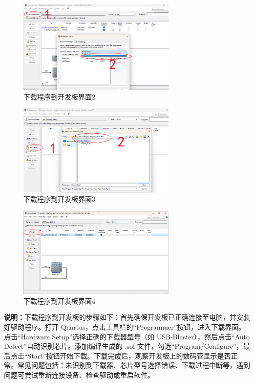 \documentclass[UTF8]{article}
\theoremstyle{MyLineTheoremStyle} %
\theoremstyle{MyBlockTheoremStyle} %
\theoremstyle{MySubsubsectionStyle} %
\begin{document}
\begin{enumerate}
    \begin{figure}[H]
        \centering
        \includegraphics[width=0.7\textwidth]{step9_2.png}
        \caption{下载程序到开发板界面2}
        \label{fig:step9_2}
    \end{figure}

    \begin{figure}[H]
        \centering
        \includegraphics[width=0.7\textwidth]{step9_3.png}
        \caption{下载程序到开发板界面3}
        \label{fig:step9_3}
    \end{figure}

    \begin{figure}[H]
        \centering
        \includegraphics[width=0.7\textwidth]{step9_4.png}
        \caption{下载程序到开发板界面4}
        \label{fig:step9_4}
    \end{figure}
    \textbf{说明：}下载程序到开发板的步骤如下：首先确保开发板已正确连接至电脑，并安装好驱动程序。打开 Quartus，点击工具栏的“Programmer”按钮，进入下载界面。点击“Hardware Setup”选择正确的下载器型号（如 USB-Blaster），然后点击“Auto Detect”自动识别芯片。添加编译生成的 .sof 文件，勾选“Program/Configure”，最后点击“Start”按钮开始下载。下载完成后，观察开发板上的数码管显示是否正常。常见问题包括：未识别到下载器、芯片型号选择错误、下载过程中断等，遇到问题可尝试重新连接设备、检查驱动或重启软件。
\end{enumerate}
\end{document}
